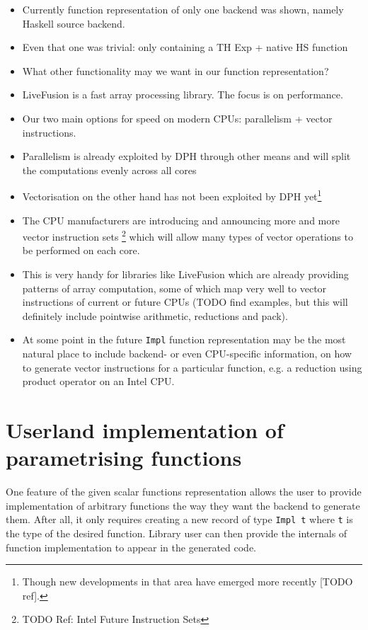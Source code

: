 \documentclass[preamble.tex]{subfiles}
\begin{document}
\begin{itemize}
\item Currently function representation of only one backend was shown, namely Haskell source backend.
\item Even that one was trivial: only containing a TH Exp + native HS function
\item What other functionality may we want in our function representation?
\item LiveFusion is a fast array processing library. The focus is on performance.
\item Our two main options for speed on modern CPUs: parallelism + vector instructions.
\item Parallelism is already exploited by DPH through other means and will split the computations evenly across all cores
\item Vectorisation on the other hand has not been exploited by DPH yet\footnote{Though new developments in that area have emerged more recently [TODO ref].}
\item The CPU manufacturers are introducing and announcing more and more vector instruction sets \footnote{TODO Ref: Intel Future Instruction Sets} which will allow many types of vector operations to be performed on each core.
\item This is very handy for libraries like LiveFusion which are already providing patterns of array computation, some of which map very well to vector instructions of current or future CPUs (TODO find examples, but this will definitely include pointwise arithmetic, reductions and pack).
\item At some point in the future \texttt{Impl} function representation may be the most natural place to include backend- or even CPU-specific information, on how to generate vector instructions for a particular function, e.g. a reduction using product operator on an Intel CPU.
\end{itemize}

\section{Userland implementation of parametrising functions}

One feature of the given scalar functions representation allows the user to provide implementation of arbitrary functions the way they want the backend to generate them. After all, it only requires creating a new record of type \texttt{Impl t} where \texttt{t} is the type of the desired function. Library user can then provide the internals of function implementation to appear in the generated code.
\end{document}
